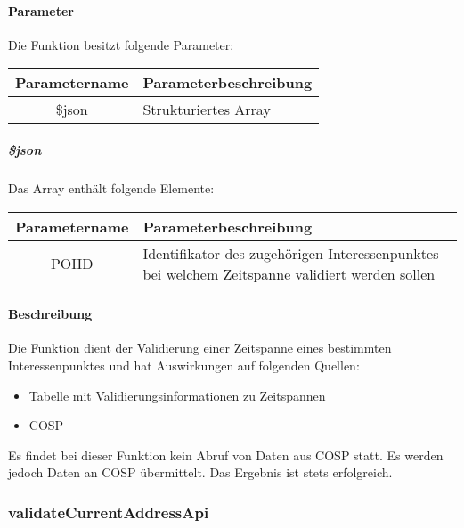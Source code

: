 \paragraph{Parameter} Die Funktion besitzt folgende Parameter:
\begin{table}[H]
	\begin{tabular}{|c|p{11cm}|}
		\hline
		\textbf{Parametername} & \textbf{Parameterbeschreibung} \\ \hline
		\$json & Strukturiertes Array \\ \hline
	\end{tabular}
\end{table}
\subparagraph{\$json}Das Array enthält folgende Elemente:
\begin{table}[H]
	\begin{tabular}{|c|p{11cm}|}
		\hline
		\textbf{Parametername} & \textbf{Parameterbeschreibung} \\ \hline
		POIID & Identifikator des zugehörigen Interessenpunktes bei welchem Zeitspanne validiert werden sollen \\ \hline
	\end{tabular}
\end{table}
\paragraph{Beschreibung} Die Funktion dient der Validierung einer Zeitspanne eines bestimmten Interessenpunktes und hat Auswirkungen auf folgenden Quellen:
\begin{itemize}
	\item Tabelle mit Validierungsinformationen zu Zeitspannen
	\item COSP
\end{itemize}
Es findet bei dieser Funktion kein Abruf von Daten aus {\glqq COSP\grqq} statt. Es werden jedoch Daten an {\glqq COSP\grqq} übermittelt. Das Ergebnis ist stets erfolgreich.
\subsubsection{validateCurrentAddressApi}
